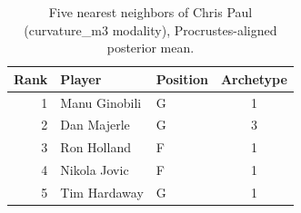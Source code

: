 \begin{table}[htbp]
  \centering\small
  \begin{tabular}{rllc}
    \toprule
    Rank & Player & Position & Archetype \\
    \midrule
    1 & Manu Ginobili & G & 1 \\
    2 & Dan Majerle & G & 3 \\
    3 & Ron Holland & F & 1 \\
    4 & Nikola Jovic & F & 1 \\
    5 & Tim Hardaway & G & 1 \\
    \bottomrule
  \end{tabular}
  \caption{Five nearest neighbors of Chris Paul (curvature_m3 modality), Procrustes-aligned posterior mean.}
  \label{tab:Chris_Paul_neighbors_curvature_m3}
\end{table}

